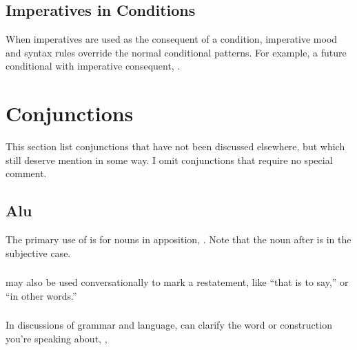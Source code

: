 {\subsection{Imperatives in Conditions} When imperatives are used as
the consequent of a condition, imperative mood and syntax rules
override the normal conditional patterns.  For example, a future
conditional with imperative consequent,  .  


\section{Conjunctions}
\noindent This section list conjunctions that have not been discussed
elsewhere, but which still deserve mention in some way.  I omit
conjunctions that require no special comment.

\subsection{Alu} The primary use of  is for nouns in
apposition,  .  Note
that the noun after  is in the subjective case.
\label{syn:conj:alu}

\subsubsection{}  may also be used conversationally to mark a
restatement, like ``that is to say,'' or ``in other words.''
 

\subsubsection{} In discussions of grammar and language,  can
clarify the word or construction you're speaking about,
,
 

}
